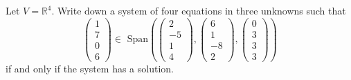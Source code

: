 \documentclass[12pt]{article}
\newenvironment{problem}[2][Problem]
{
	\begin{trivlist} 
		\item[\hskip \labelsep {\bfseries #1 #2:}]
	}
{
	\end{trivlist}
	}
\newenvironment{solution}[1][Solution]
{
	\begin{trivlist} 
		\item[\hskip \labelsep {\itshape #1:}]
	}
	{
	\end{trivlist}
}
\begin{document}
\newpage
\begin{problem}{2}
Let $V=\mathbb{R}^4$. Write down a system of four equations in three unknowns such that
\[
\begin{pmatrix} 1\\7\\0\\6\end{pmatrix} \in \text{ Span}\left( \begin{pmatrix} 2\\-5\\1\\4 \end{pmatrix}, \begin{pmatrix} 6\\1\\-8\\2 \end{pmatrix}, \begin{pmatrix} 0\\3\\3\\3 \end{pmatrix} \right)
\]
if and only if the system has a solution.
\noindent
\newline
\newline
\begin{solution}

\end{solution}
\end{problem}
\end{document}
